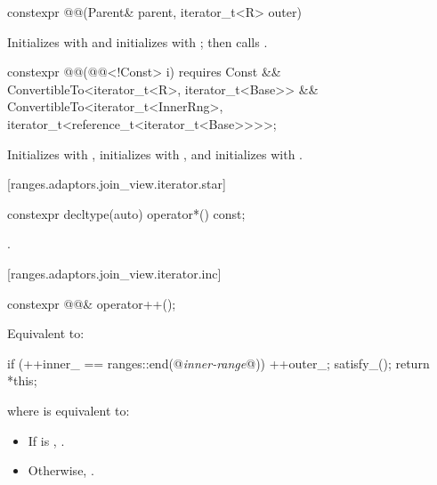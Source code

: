 \begin{itemdecl}
constexpr @@(Parent& parent, iterator_t<R> outer)
\end{itemdecl}

\begin{itemdescr}
\pnum
\effects Initializes  with  and initializes
 with ; then calls .
\end{itemdescr}

\begin{itemdecl}
constexpr @@(@@<!Const> i) requires Const &&
  ConvertibleTo<iterator_t<R>, iterator_t<Base>> &&
  ConvertibleTo<iterator_t<InnerRng>,
      iterator_t<reference_t<iterator_t<Base>>>>;
\end{itemdecl}

\begin{itemdescr}
\pnum
\effects Initializes  with , initializes
 with , and initializes  with
.
\end{itemdescr}

[ranges.adaptors.join_view.iterator.star]{}

\begin{itemdecl}
constexpr decltype(auto) operator*() const;
\end{itemdecl}

\begin{itemdescr}
\pnum
\returns {}.
\end{itemdescr}

[ranges.adaptors.join_view.iterator.inc]{}

\begin{itemdecl}
constexpr @@& operator++();
\end{itemdecl}

\begin{itemdescr}
\pnum
\effects Equivalent to:
\begin{codeblock}
if (++inner_ == ranges::end(@\textit{inner-range}@)) {
  ++outer_;
  satisfy_();
}
return *this;
\end{codeblock}

where  is equivalent to:
\begin{itemize}
\item If  is , .
\item Otherwise, .
\end{itemize}
\end{itemdescr}

